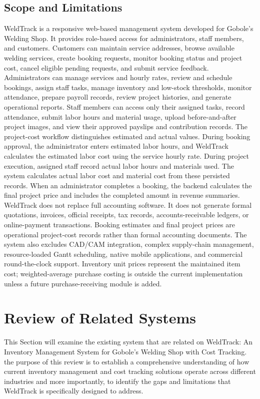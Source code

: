 \documentclass[12pt, letterpaper]{article}
\begin{document}
\subsection{Scope and Limitations}
\hspace*{2em}WeldTrack is a responsive web-based management system developed for Gobole's Welding Shop. It provides role-based access for administrators, staff members, and customers. Customers can maintain service addresses, browse available welding services, create booking requests, monitor booking status and project cost, cancel eligible pending requests, and submit service feedback. Administrators can manage services and hourly rates, review and schedule bookings, assign staff tasks, manage inventory and low-stock thresholds, monitor attendance, prepare payroll records, review project histories, and generate operational reports. Staff members can access only their assigned tasks, record attendance, submit labor hours and material usage, upload before-and-after project images, and view their approved payslips and contribution records.
\hspace*{2em}The project-cost workflow distinguishes estimated and actual values. During booking approval, the administrator enters estimated labor hours, and WeldTrack calculates the estimated labor cost using the service hourly rate. During project execution, assigned staff record actual labor hours and materials used. The system calculates actual labor cost and material cost from these persisted records. When an administrator completes a booking, the backend calculates the final project price and includes the completed amount in revenue summaries.
\hspace*{2em}WeldTrack does not replace full accounting software. It does not generate formal quotations, invoices, official receipts, tax records, accounts-receivable ledgers, or online-payment transactions. Booking estimates and final project prices are operational project-cost records rather than formal accounting documents. The system also excludes CAD/CAM integration, complex supply-chain management, resource-loaded Gantt scheduling, native mobile applications, and commercial round-the-clock support. Inventory unit prices represent the maintained item cost; weighted-average purchase costing is outside the current implementation unless a future purchase-receiving module is added.

\section{Review of Related Systems}
\hspace*{2em}This Section will examine the existing system that are related on WeldTrack: An Inventory Management System for Gobole’s Welding Shop with Cost Tracking. the purpose of this review is to establish a comprehensive understanding of how current inventory management and cost tracking solutions operate across different industries and more importantly, to identify the gaps and limitations that WeldTrack is specifically designed to address.
\end{document}

